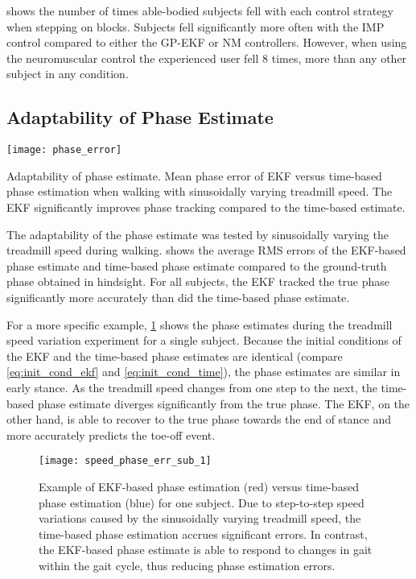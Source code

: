  shows the number of times able-bodied subjects fell
with each control strategy when stepping on blocks. Subjects fell significantly
more often with the IMP control compared to either the GP-EKF or NM controllers.
However, when using the neuromuscular control the experienced user fell 8 times,
more than any other subject in any condition.

\subsection{Adaptability of Phase Estimate}

\begin{marginfigure}
    \centering
    \texttt{[image: phase\_error]} 
    \caption[Adaptability of phase estimate]{Adaptability of phase estimate.
    Mean phase error of EKF versus time-based phase estimation when walking with
    sinusoidally varying treadmill speed. The EKF significantly improves phase
    tracking compared to the time-based
    estimate.}\label{fig:speed_phase_err_mean}
\end{marginfigure}
The adaptability of the phase estimate was tested by sinusoidally varying the
treadmill speed during walking.  shows the
average RMS errors of the EKF-based phase estimate and time-based phase estimate
compared to the ground-truth phase obtained in hindsight. For all subjects, the
EKF tracked the true phase significantly more accurately than did the time-based
phase estimate.

For a more specific example, \cref{fig:speed_phase_est_sub_1} shows the phase
estimates during the treadmill speed variation experiment for a single subject.
Because the initial conditions of the EKF and the time-based phase estimates are
identical (compare \cref{eq:init_cond_ekf} and \cref{eq:init_cond_time}), the
phase estimates are similar in early stance. As the treadmill speed changes from
one step to the next, the time-based phase estimate diverges significantly from
the true phase. The EKF, on the other hand, is able to recover to the true phase
towards the end of stance and more accurately predicts the toe-off event.
\begin{figure}[t]
    \centering
    \texttt{[image: speed\_phase\_err\_sub\_1]} 
    \caption[Example of EKF-based phase estimation versus time-based phase
    estimation for one subject]{Example of EKF-based phase estimation (red)
    versus time-based phase estimation (blue) for one subject. Due to
    step-to-step speed variations caused by the sinusoidally varying treadmill
    speed, the time-based phase estimation accrues significant errors.  In
    contrast, the EKF-based phase estimate is able to respond to changes in gait
    within the gait cycle, thus reducing phase estimation
    errors.}\label{fig:speed_phase_est_sub_1}
\end{figure}

